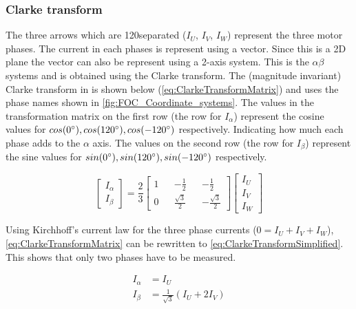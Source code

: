 \documentclass[]{report}
\begin{document}
\subsubsection{Clarke transform}
The three arrows which are 120\degree separated ($I_U$, $I_V$, $I_W$) represent the three motor phases. The current in each phases is represent using a vector. Since this is a 2D plane the vector can also be represent using a 2-axis system. This is the $\alpha\beta$ systems and is obtained using the Clarke transform. The (magnitude invariant) Clarke transform in is shown below (\autoref{eq:ClarkeTransformMatrix}) and uses the phase names shown in \autoref{fig:FOC_Coordinate_systems}. The values in the transformation matrix on the first row (the row for $I_\alpha$) represent the cosine values for $cos(0\degree), cos(120\degree), cos(-120\degree)$ respectively. Indicating how much each phase adds to the $\alpha$ axis. The values on the second row (the row for $I_\beta$) represent the sine values for $sin(0\degree), sin(120\degree), sin(-120\degree)$ respectively.



\begin{equation} \label{eq:ClarkeTransformMatrix}
\begin{bmatrix} I_\alpha \\ I_\beta \end{bmatrix}
= \frac{2}{3} 
\begin{bmatrix}
	1 && -\frac{1}{2} && -\frac{1}{2} \\
	0 && \frac{\sqrt{3}}{2} && -\frac{\sqrt{3}}{2}
\end{bmatrix}
\begin{bmatrix} I_U \\ I_V \\ I_W \end{bmatrix}
\end{equation}

Using Kirchhoff's current law for the three phase currents ($0 = I_U + I_V + I_W$), \autoref{eq:ClarkeTransformMatrix} can be rewritten to \autoref{eq:ClarkeTransformSimplified}. This shows that only two phases have to be measured.

\begin{equation} \label{eq:ClarkeTransformSimplified}
\begin{split}
	I_\alpha &= I_U \\
	I_\beta &= \frac{1}{\sqrt{3}} (I_U + 2I_V)
\end{split}
\end{equation}
\end{document}
